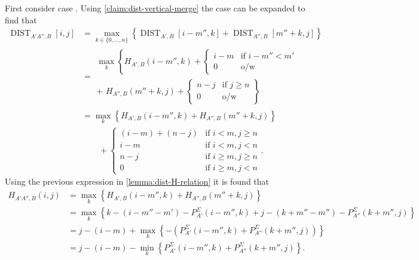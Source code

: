 \documentclass[twoside,11pt,openright]{report}
\newcommand{\DIST}{\operatorname{DIST}}
\newcommand*{\circled}[1]{\tikz[baseline=(char.base)]{
                          \node[shape=circle,draw,inner sep=2pt] (char) {#1};}}
\begin{document}
First consider case \circled{3}. Using \cref{claim:dist-vertical-merge} the case can be expanded to find that
\begin{align*}
  \DIST_{A'A'',B}[i, j] &= \max_{k \in \{0, \dots, n\} } \left\{ \DIST_{A',B}[i - m'', k] + \DIST_{A'',B}[m'' + k, j] \right\} \\
              &=  \begin{aligned}
                    \max_k \left\{
                      H_{A',B}(i - m'', k) + \left\{
                        \begin{array}{ll}
                          i - m & \text{if } i - m'' < m' \\
                          0     & \text{o/w}
                        \end{array} \right. \right. \\
                      \left. +\,\,H_{A'',B}(m'' + k, j) + \left\{
                        \begin{array}{ll}
                          n - j & \text{if } j \geq n \\
                          0     & \text{o/w}
                        \end{array} \right.
                    \right\}
                 \end{aligned}\\
              &= \max_k \left\{ H_{A',B}(i - m'', k) + H_{A'',B}(m'' + k, j) \right\}
                  \\ &\quad\quad+ \begin{cases}
                      (i - m) + (n - j)   & \text{if } i < m, j \geq n \\
                      i - m               & \text{if } i < m, j < n \\
                      n - j               & \text{if } i \geq m, j \geq n \\
                      0                   & \text{if } i \geq m, j < n
                    \end{cases}.
\end{align*}
Using the previous expression in \cref{lemma:dist-H-relation} it is found that
\begin{align*}
  H_{A'A'',B}(i, j) &= \max_k \left\{ H_{A',B}(i - m'', k) + H_{A'',B}(m'' + k, j) \right\} \\
                    &= \max_k \left\{ k - (i - m'' - m') - P_{A'}^{\Sigma}(i - m'', k) + j - (k + m'' - m'') - P_{A''}^{\Sigma}(k + m'', j) \right\} \\
                    &= j - (i - m) + \max_k \left\{ -\left( P_{A'}^{\Sigma}(i - m'', k) + P_{A''}^{\Sigma}(k + m'', j) \right)  \right\} \\
                    &= j - (i - m) - \min_k \left\{ P_{A'}^{\Sigma}(i - m'', k) + P_{A''}^{\Sigma}(k + m'', j) \right\}.
\end{align*}
\end{document}
